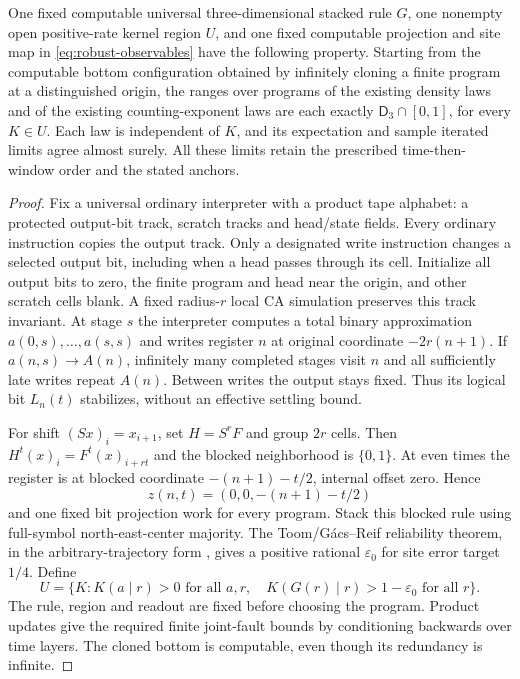 \begin{theorem}\label{thm:robust-third}
One fixed computable universal three-dimensional stacked rule $G$,
one nonempty open positive-rate kernel region $U$, and one fixed
computable projection and site map in \eqref{eq:robust-observables}
have the following property. Starting from the computable bottom
configuration obtained by infinitely cloning a finite program at
a distinguished origin, the ranges over programs of the existing
density laws and of the existing counting-exponent laws are each
exactly $\mathsf D_3\cap[0,1]$, for every $K\in U$.
Each law is independent of $K$, and its expectation and sample
iterated limits agree almost surely. All these limits retain the
prescribed time-then-window order and the stated anchors.
\end{theorem}
\begin{proof}
Fix a universal ordinary interpreter with a product tape alphabet:
a protected output-bit track, scratch tracks and head/state fields.
Every ordinary instruction copies the output track. Only a designated
write instruction changes a selected output bit, including when a
head passes through its cell. Initialize all output bits to zero,
the finite program and head near the origin, and other scratch
cells blank. A fixed radius-$r$ local CA simulation preserves this
track invariant. At stage $s$ the interpreter computes a total
binary approximation $a(0,s),\ldots,a(s,s)$ and writes register $n$
at original coordinate $-2r(n+1)$. If $a(n,s)\to A(n)$, infinitely
many completed stages visit $n$ and all sufficiently late writes
repeat $A(n)$. Between writes the output stays fixed. Thus its
logical bit $L_n(t)$ stabilizes, without an effective settling bound.

For shift $(Sx)_i=x_{i+1}$, set $H=S^rF$ and group $2r$ cells.
Then $H^t(x)_i=F^t(x)_{i+rt}$ and the blocked neighborhood is
$\{0,1\}$. At even times the register is at blocked coordinate
$-(n+1)-t/2$, internal offset zero. Hence
\[
 z(n,t)=(0,0,-(n+1)-t/2)
\]
and one fixed bit projection work for every program. Stack this
blocked rule using full-symbol north-east-center majority. The
Toom/G\'acs--Reif reliability theorem, in the arbitrary-trajectory
form \cite[Theorem~3.1]{thermalTrajectories}, gives a positive
rational $\varepsilon_0$ for site error target $1/4$. Define
\[
 U=\{K: K(a\mid r)>0\text{ for all }a,r,\quad
              K(G(r)\mid r)>1-\varepsilon_0\text{ for all }r\}.
\]
The rule, region and readout are fixed before choosing the program.
Product updates give the required finite joint-fault bounds by
conditioning backwards over time layers. The cloned bottom is
computable, even though its redundancy is infinite.


\end{proof}
